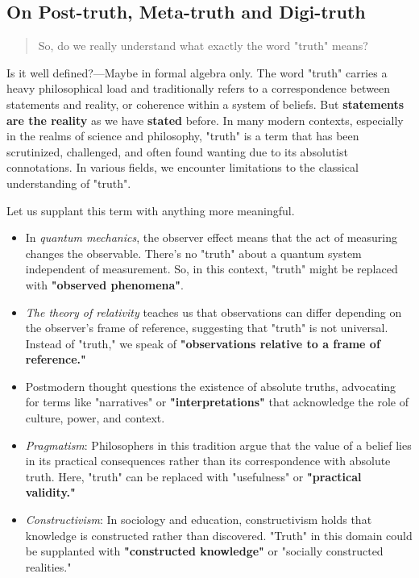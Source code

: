 \documentclass[11pt,a4]{article}
\begin{document}
\subsection{On Post-truth, Meta-truth and Digi-truth}




    \begin{quote}
        So, do we really understand what exactly the word "truth" means?
    \end{quote}

    Is it well defined?---Maybe in formal algebra only.
    The word "truth" carries a heavy philosophical load
    and traditionally refers to a correspondence between statements and reality,
    or coherence within a system of beliefs.
    But \textbf{statements are the reality} as we have \textbf{stated} before.
    In many modern contexts, especially in the realms of science and philosophy,
    "truth" is a term that has been scrutinized, challenged,
    and often found wanting due to its absolutist connotations.
    In various fields, we encounter limitations to the classical
    understanding of "truth".

    Let us supplant this term with anything more meaningful.

    \begin{itemize}

        \item In \textit{quantum mechanics}, the observer effect means that the act of measuring changes the observable. There's no "truth" about a quantum system independent of measurement. So, in this context, "truth" might be replaced with \textbf{"observed phenomena"}.
        \item \textit{The theory of relativity} teaches us that observations can differ depending on the observer's frame of reference, suggesting that "truth" is not universal. Instead of "truth," we speak of \textbf{"observations relative to a frame of reference."}
        \item Postmodern thought questions the existence of absolute truths, advocating for terms like "narratives" or \textbf{"interpretations"} that acknowledge the role of culture, power, and context.
        \item \textit{Pragmatism}: Philosophers in this tradition argue that the value of a belief lies in its practical consequences rather than its correspondence with absolute truth. Here, "truth" can be replaced with "usefulness" or \textbf{"practical validity."}
        \item \textit{Constructivism}: In sociology and education, constructivism holds that knowledge is constructed rather than discovered. "Truth" in this domain could be supplanted with \textbf{"constructed knowledge"} or "socially constructed realities."
    \end{itemize}
\end{document}
